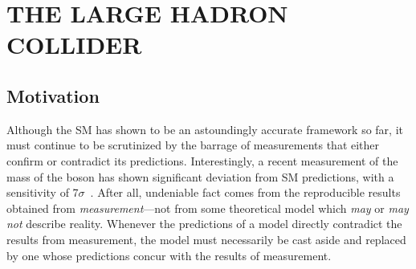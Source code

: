 \chapter{THE LARGE HADRON COLLIDER}
\label{ch:lhc}

\section{Motivation}
Although the SM
has shown to be an astoundingly accurate framework so far, it must continue to be scrutinized by the barrage of measurements that either confirm or contradict its predictions.
Interestingly, a recent measurement of the mass of the \PW boson has shown significant deviation from SM predictions, with a sensitivity of 7$\sigma$~\cite{cdf_collaboration_high-precision_2022}.
After all, undeniable fact comes from the reproducible results obtained from \emph{measurement}---not from some theoretical model which \emph{may} or \emph{may not} describe reality.
Whenever the predictions of a model directly contradict the results from measurement, the model must necessarily be cast aside and replaced by one whose predictions concur with the results of measurement.

